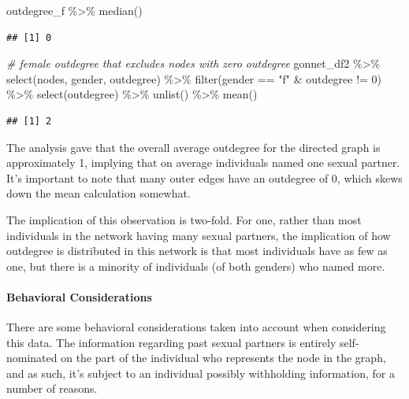 \documentclass[12pt]{article}
\newenvironment{Shaded}{\begin{snugshade}}{\end{snugshade}}
\newcommand{\CommentTok}[1]{\textcolor[rgb]{0.56,0.35,0.01}{\textit{#1}}}
\newcommand{\DecValTok}[1]{\textcolor[rgb]{0.00,0.00,0.81}{#1}}
\newcommand{\FunctionTok}[1]{\textcolor[rgb]{0.00,0.00,0.00}{#1}}
\newcommand{\NormalTok}[1]{#1}
\newcommand{\SpecialCharTok}[1]{\textcolor[rgb]{0.00,0.00,0.00}{#1}}
\newcommand{\StringTok}[1]{\textcolor[rgb]{0.31,0.60,0.02}{#1}}
\begin{document}
\begin{Shaded}
\begin{Highlighting}[]
\NormalTok{outdegree\_f }\SpecialCharTok{\%\textgreater{}\%} \FunctionTok{median}\NormalTok{()}
\end{Highlighting}
\end{Shaded}

\begin{verbatim}
## [1] 0
\end{verbatim}

\begin{Shaded}
\begin{Highlighting}[]
\CommentTok{\# female outdegree that excludes nodes with zero outdegree}
\NormalTok{gonnet\_df2 }\SpecialCharTok{\%\textgreater{}\%}
  \FunctionTok{select}\NormalTok{(nodes, gender, outdegree) }\SpecialCharTok{\%\textgreater{}\%}
  \FunctionTok{filter}\NormalTok{(gender }\SpecialCharTok{==} \StringTok{"f"} \SpecialCharTok{\&}\NormalTok{ outdegree }\SpecialCharTok{!=} \DecValTok{0}\NormalTok{) }\SpecialCharTok{\%\textgreater{}\%}
  \FunctionTok{select}\NormalTok{(outdegree) }\SpecialCharTok{\%\textgreater{}\%}
  \FunctionTok{unlist}\NormalTok{() }\SpecialCharTok{\%\textgreater{}\%} \FunctionTok{mean}\NormalTok{()}
\end{Highlighting}
\end{Shaded}

\begin{verbatim}
## [1] 2
\end{verbatim}

The analysis gave that the overall average outdegree for the directed graph is approximately 1, implying that on average individuals named one sexual partner. It's important to note that many outer edges have an outdegree of 0, which skews down the mean calculation somewhat.

The implication of this observation is two-fold. For one, rather than most individuals in the network having many sexual partners, the implication of how outdegree is distributed in this network is that most individuals have as few as one, but there is a minority of individuals (of both genders) who named more.

\hypertarget{behavioral-considerations}{%
\paragraph{Behavioral Considerations}\label{behavioral-considerations}}

There are some behavioral considerations taken into account when considering this data. The information regarding past sexual partners is entirely self-nominated on the part of the individual who represents the node in the graph, and as such, it's subject to an individual possibly withholding information, for a number of reasons.
\end{document}
